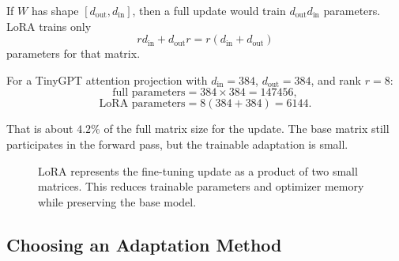 If \(W\) has shape \([d_{\text{out}}, d_{\text{in}}]\), then a full update would train \(d_{\text{out}}d_{\text{in}}\) parameters. LoRA trains only
\[
r d_{\text{in}} + d_{\text{out}} r
= r(d_{\text{in}}+d_{\text{out}})
\]
parameters for that matrix.

For a TinyGPT attention projection with \(d_{\text{in}}=384\), \(d_{\text{out}}=384\), and rank \(r=8\):
\[
\text{full parameters} = 384 \times 384 = 147456,
\]
\[
\text{LoRA parameters} = 8(384+384)=6144.
\]

That is about \(4.2\%\) of the full matrix size for the update. The base matrix still participates in the forward pass, but the trainable adaptation is small.

\begin{figure}[htbp]
\centering
{}
\caption{LoRA represents the fine-tuning update as a product of two small matrices. This reduces trainable parameters and optimizer memory while preserving the base model.}
\label{fig:lora}
\end{figure}

\subsection*{Choosing an Adaptation Method}

